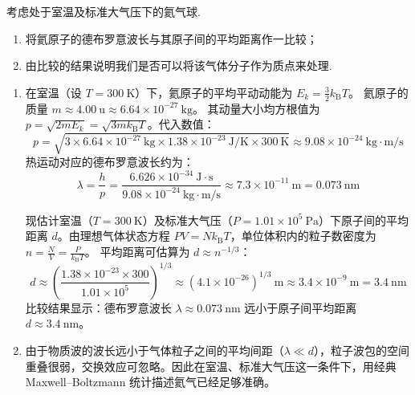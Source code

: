 \begin{exercise}\label{ex:23.6}
考虑处于室温及标准大气压下的氦气球.
\begin{enumerate}
  \item[(a)] 将氦原子的德布罗意波长与其原子间的平均距离作一比较；
  \item[(b)] 由比较的结果说明我们是否可以将该气体分子作为质点来处理.
\end{enumerate}
\end{exercise}
\begin{solution}
\begin{enumerate}
    \item[(a)] 在室温（设 $T = 300 \ \mathrm{K}$）下，氦原子的平均平动动能为 $E_k = \frac{3}{2}k_{\mathrm{B}} T$。
    氦原子的质量 $m \approx 4.00 \ \mathrm{u} \approx 6.64 \times 10^{-27} \ \mathrm{kg}$。
    其动量大小均方根值为 $p = \sqrt{2mE_k} = \sqrt{3mk_{\mathrm{B}} T}$。代入数值：
    $$ p = \sqrt{3 \times 6.64 \times 10^{-27} \ \mathrm{kg} \times 1.38 \times 10^{-23} \ \mathrm{J/K} \times 300 \ \mathrm{K}} \approx 9.08 \times 10^{-24} \ \mathrm{kg \cdot m/s} $$
    热运动对应的德布罗意波长约为：
    $$ \lambda = \frac{h}{p} = \frac{6.626 \times 10^{-34} \ \mathrm{J \cdot s}}{9.08 \times 10^{-24} \ \mathrm{kg \cdot m/s}} \approx 7.3 \times 10^{-11} \ \mathrm{m} = 0.073 \ \mathrm{nm} $$
    
    现估计室温（$T = 300 \ \mathrm{K}$）及标准大气压（$P = 1.01 \times 10^5 \ \mathrm{Pa}$）下原子间的平均距离 $d$。由理想气体状态方程 $PV = N k_{\mathrm{B}} T$，单位体积内的粒子数密度为 $n = \frac{N}{V} = \frac{P}{k_{\mathrm{B}} T}$。
    平均距离可估算为 $d \approx n^{-1/3}$：
    $$ d \approx \left( \frac{1.38 \times 10^{-23} \times 300}{1.01 \times 10^5} \right)^{1/3} \approx (4.1 \times 10^{-26})^{1/3} \ \mathrm{m} \approx 3.4 \times 10^{-9} \ \mathrm{m} = 3.4 \ \mathrm{nm} $$
    比较结果显示：德布罗意波长 $\lambda \approx 0.073 \ \mathrm{nm}$ 远小于原子间平均距离 $d \approx 3.4 \ \mathrm{nm}$。

    \item[(b)] 由于物质波的波长远小于气体粒子之间的平均间距（$\lambda \ll d$），粒子波包的空间重叠很弱，交换效应可忽略。因此在室温、标准大气压这一条件下，用经典 Maxwell--Boltzmann 统计描述氦气已经足够准确。
\end{enumerate}
\end{solution}

